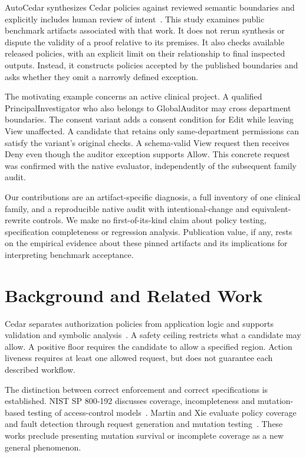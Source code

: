 \documentclass[sigconf,nonacm]{acmart}
\begin{document}
AutoCedar synthesizes Cedar policies against reviewed semantic boundaries and explicitly includes human review of intent~\cite{autocedar}. This study examines public benchmark artifacts associated with that work. It does not rerun synthesis or dispute the validity of a proof relative to its premises. It also checks available released policies, with an explicit limit on their relationship to final inspected outputs. Instead, it constructs policies accepted by the published boundaries and asks whether they omit a narrowly defined exception.

The motivating example concerns an active clinical project. A qualified PrincipalInvestigator who also belongs to GlobalAuditor may cross department boundaries. The consent variant adds a consent condition for Edit while leaving View unaffected. A candidate that retains only same-department permissions can satisfy the variant's original checks. A schema-valid View request then receives Deny even though the auditor exception supports Allow. This concrete request was confirmed with the native evaluator, independently of the subsequent family audit.

Our contributions are an artifact-specific diagnosis, a full inventory of one clinical family, and a reproducible native audit with intentional-change and equivalent-rewrite controls. We make no first-of-its-kind claim about policy testing, specification completeness or regression analysis. Publication value, if any, rests on the empirical evidence about these pinned artifacts and its implications for interpreting benchmark acceptance.

\section{Background and Related Work}
Cedar separates authorization policies from application logic and supports validation and symbolic analysis~\cite{cedar}. A safety ceiling restricts what a candidate may allow. A positive floor requires the candidate to allow a specified region. Action liveness requires at least one allowed request, but does not guarantee each described workflow.

The distinction between correct enforcement and correct specifications is established. NIST SP 800-192 discusses coverage, incompleteness and mutation-based testing of access-control models~\cite{nist}. Martin and Xie evaluate policy coverage and fault detection through request generation and mutation testing~\cite{martin}. These works preclude presenting mutation survival or incomplete coverage as a new general phenomenon.
\end{document}
